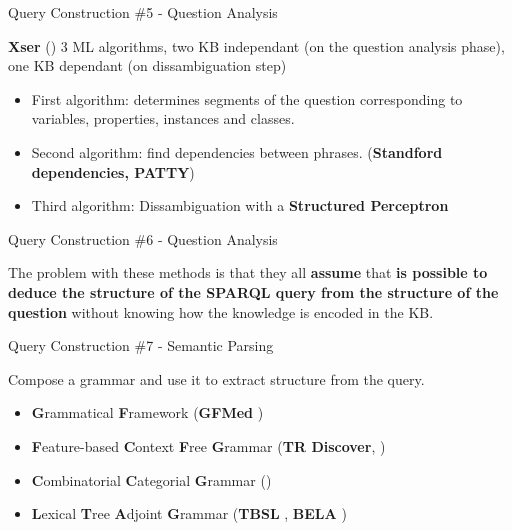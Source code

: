 \documentclass{beamer}
\begin{document}
\begin{frame}{Query Construction \#5 - Question Analysis}
  \begin{card}
    \textbf{Xser} (\cite{xu2014a}) 3 ML algorithms, two KB independant (on the question analysis phase), one KB dependant (on dissambiguation step)
    \begin{itemize}
      \item First algorithm: determines segments of the question corresponding to variables, properties, instances and classes.
      \item Second algorithm: find dependencies between phrases. (\textbf{Standford dependencies, PATTY})
      \item Third algorithm: Dissambiguation with a \textbf{Structured Perceptron} 
    \end{itemize}
  \end{card}
\end{frame}

\begin{frame}{Query Construction \#6 - Question Analysis}
  \begin{card}
    The problem with these methods is that they all \textbf{assume} that \textbf{is possible to deduce the structure of the SPARQL query from the structure of the question} without knowing how the knowledge is encoded in the KB\@.
  \end{card}
\end{frame}

\begin{frame}{Query Construction \#7 - Semantic Parsing}
  \begin{card}
    Compose a grammar and use it to extract structure from the query.
    \begin{itemize}
      \item \textbf{G}rammatical \textbf{F}ramework (\textbf{GFMed} \cite{marginean2017a})
      \item \textbf{F}eature-based \textbf{C}ontext \textbf{F}ree \textbf{G}rammar (\textbf{TR Discover}, \cite{song2015a})
      \item \textbf{C}ombinatorial \textbf{C}ategorial \textbf{G}rammar (\cite{hakimov2015a})
      \item \textbf{L}exical \textbf{T}ree \textbf{A}djoint \textbf{G}rammar (\textbf{TBSL} \cite{unger2012a}, \textbf{BELA} \cite{walter2012a})
    \end{itemize}
  \end{card}
\end{frame}
\end{document}
